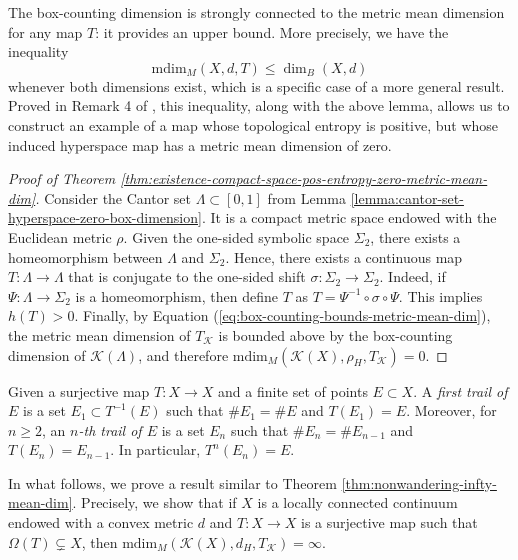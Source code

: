 \documentclass[sn-mathphys-num]{sn-jnl}%
\theoremstyle{thmstyleone}%
\theoremstyle{thmstyletwo}%
\theoremstyle{thmstylethree}%
\newcommand*\induce[1]{#1_\mathcal{K}}
\newcommand*\hyp[1]{\mathcal{#1}}
\begin{document}
The box-counting dimension is strongly connected to the metric mean dimension for any map $T$: it provides an upper bound. More precisely, we have the inequality
\begin{equation}\label{eq:box-counting-bounds-metric-mean-dim}
    \text{mdim}_M(X, d, T) \leq \dim_B(X, d)
\end{equation}
whenever both dimensions exist, which is a specific case of a more general result. Proved in Remark 4 of \cite{velozo_velozo_2017}, this inequality, along with the above lemma, allows us to construct an example of a map whose topological entropy is positive, but whose induced hyperspace map has a metric mean dimension of zero.

\begin{proof}[Proof of Theorem \emph{\ref{thm:existence-compact-space-pos-entropy-zero-metric-mean-dim}}]
    Consider the Cantor set $\Lambda \subset [0, 1]$ from Lemma \ref{lemma:cantor-set-hyperspace-zero-box-dimension}. It is a compact metric space endowed with the Euclidean metric $\rho$. Given the one-sided symbolic space $\Sigma_2$, there exists a homeomorphism between $\Lambda$ and $\Sigma_2$. Hence, there exists a continuous map $T: \Lambda \to \Lambda$ that is conjugate to the one-sided shift $\sigma: \Sigma_2 \to \Sigma_2$. Indeed, if $\Psi: \Lambda \to \Sigma_2$ is a homeomorphism, then define $T$ as $T = \Psi^{-1}\circ\sigma\circ\Psi$. This implies $h(T) > 0$. Finally, by Equation (\ref{eq:box-counting-bounds-metric-mean-dim}), the metric mean dimension of $\induce{T}$ is bounded above by the box-counting dimension of $\hyp{K}(\Lambda)$, and therefore $\text{mdim}_M(\hyp{K}(X), \rho_H, \induce{T}) = 0$.  
\end{proof}

Given a surjective map $T: X \to X$ and a finite set of points $E \subset X$. A \emph{first trail of $E$} is a set $E_1 \subset T^{-1}(E)$ such that $\#E_1 = \#E$ and $T(E_1) = E$. Moreover, for $n \geq 2$, an \emph{$n$-th trail of $E$} is a set $E_n$ such that $\#E_n = \#E_{n - 1}$ and $T(E_n) = E_{n - 1}$. In particular, $T^n(E_n) = E$.

In what follows, we prove a result similar to Theorem \ref{thm:nonwandering-infty-mean-dim}. Precisely, we show that if $X$ is a locally connected continuum endowed with a convex metric $d$ and $T:X \to X$ is a surjective map such that $\Omega(T) \subsetneq X$, then $\text{mdim}_M(\hyp{K}(X), d_H, \induce{T}) = \infty$.
\end{document}
